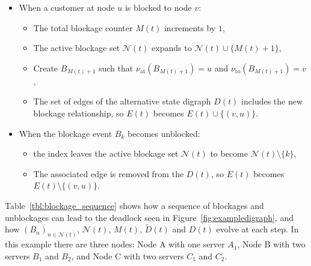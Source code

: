 \documentclass{article}
\begin{document}
\begin{itemize}
  \item When a customer at node $u$ is blocked to node $v$:
    \begin{itemize}
      \item The total blockage counter $M(t)$ increments by $1$,
      \item The active blockage set $\mathcal{N}(t)$ expands to
      $\mathcal{N}(t) \cup \{M(t) + 1\}$,
      \item Create $B_{M(t) + 1}$ such that $\nu_{\text{at}}(B_{M(t) + 1}) = u$
      and $\nu_{\text{to}}(B_{M(t) + 1}) = v$,
      \item The set of edges of the alternative state digraph $D(t)$ includes
      the new blockage relationship, so $E(t)$ becomes $E(t) \cup \{(v, u)\}$.
    \end{itemize}
  \item When the blockage event $B_k$ becomes unblocked:
    \begin{itemize}
      \item the index leaves the active blockage set $\mathcal{N}(t)$ to
      become $\mathcal{N}(t) \setminus \{k\}$,
      \item The associated edge is removed from the $D(t)$, so $E(t)$ becomes
      $E(t) \setminus \{(v, u)\}$.
    \end{itemize}
\end{itemize}

Table~\ref{tbl:blockage_sequence} shows how a sequence of blockages and
unblockages can lead to the deadlock seen in Figure~\ref{fig:exampledigraph},
and how $(B_n)_{n\in\mathcal{N}(t)}$, $\mathcal{N}(t)$, $M(t)$, $\tilde{D}(t)$
and $D(t)$ evolve at each step.
In this example there are three nodes: Node A with one server $A_1$, Node B with
two servers $B_1$ and $B_2$, and Node C with two servers $C_1$ and $C_2$.
\end{document}
